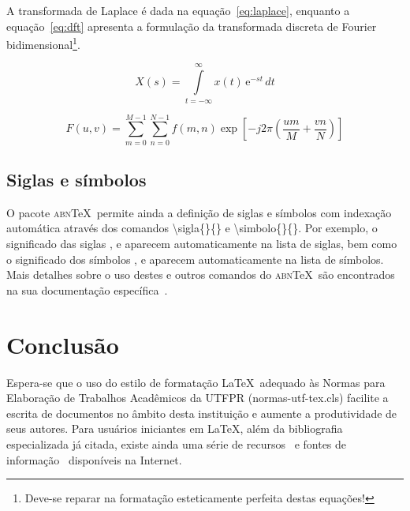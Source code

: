 \documentclass[openright]{normas-utf-tex} %
\begin{document}
A transformada de Laplace é dada na equação~\eqref{eq:laplace}, enquanto a equação~\eqref{eq:dft} apresenta a formulação da transformada discreta de Fourier bidimensional\footnote{Deve-se reparar na formatação esteticamente perfeita destas equações!}.

\begin{equation}
X(s) = \int\limits_{t = -\infty}^{\infty} x(t) \, \text{e}^{-st} \, dt
\label{eq:laplace}
\end{equation}

\begin{equation}
F(u, v) = \sum_{m = 0}^{M - 1} \sum_{n = 0}^{N - 1} f(m, n) \exp \left[ -j 2 \pi \left( \frac{u m}{M} + \frac{v n}{N} \right) \right]
\label{eq:dft}
\end{equation}

\section{Siglas e símbolos}
\label{sec:siglasSimbolos}

O pacote \textsc{abn}\TeX\ permite ainda a definição de siglas e símbolos com indexação automática através dos comandos {\ttfamily \textbackslash sigla\{\}\{\}} e {\ttfamily \textbackslash simbolo\{\}\{\}}. Por exemplo, o significado das siglas ,  e  aparecem automaticamente na lista de siglas, bem como o significado dos símbolos ,  e  aparecem automaticamente na lista de símbolos. Mais detalhes sobre o uso destes e outros comandos do \textsc{abn}\TeX\ são encontrados na sua documentação específica~\cite{abnTeX2009}.


\chapter{Conclusão}
\label{chap:conclusao}

Espera-se que o uso do estilo de formatação \LaTeX\ adequado às Normas para Elaboração de Trabalhos Acadêmicos da UTFPR ({\ttfamily normas-utf-tex.cls}) facilite a escrita de documentos no âmbito desta instituição e aumente a produtividade de seus autores. Para usuários iniciantes em \LaTeX, além da bibliografia especializada já citada, existe ainda uma série de recursos~\cite{CTAN2009} e fontes de informação~\cite{TeX-Br2009,Wikibooks2009} disponíveis na Internet.
\end{document}
